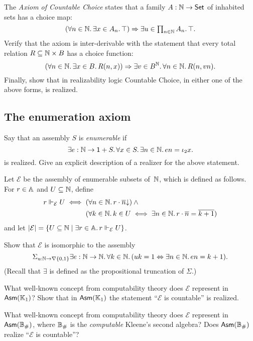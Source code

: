 \documentclass{article}
\begin{document}
The \emph{Axiom of Countable Choice} states that a family $A : \NN \to \Set$ of inhabited sets has a choice map:
%
\begin{equation*}
  \textstyle
  (\all{n \in \NN} \some{x \in A_n} \top) \lthen \some{u \in \prod_{n \in \NN} A_n} \top.
\end{equation*}
%
Verify that the axiom is inter-derivable with the statement that every total relation $R \subseteq \NN \times B$ has a choice function:
%
\begin{equation*}
  (\all{n \in \NN} \some{x \in B} R(n, x)) \lthen
  \some{v \in B^{\NN}} \all{n \in \NN} R(n, v n).
\end{equation*}
%
Finally, show that in realizability logic Countable Choice, in either one of the above forms, is realized.


\subsection{The enumeration axiom}
\label{sec:enumeration-axiom}

Say that an assembly $S$ is \emph{enumerable} if
%
\begin{equation*}
  \some{e : \NN \to \one + S}
  \all{x \in S}
  \some{n \in \NN}
  e n = \iota_2 x.
\end{equation*}
%
is realized. Give an explicit description of a realizer for the above statement.

Let $\mathcal{E}$ be the assembly of enumerable subsets of~$\NN$, which is defined as follows. For $r \in \AA$ and $U \subseteq \NN$, define
%
\begin{equation*}
  r \rz[\mathcal{E}] U
  \iff
  \begin{aligned}[t]
    & (\all{n \in \NN} \defined{r \cdot \numeral{n}}) \land {} \\
    & (\all{k \in \NN} k \in U \iff \some{n \in \NN} r \cdot \numeral{n} = \numeral{k + 1})
  \end{aligned}
\end{equation*}
%
and let $\S{\mathcal{E}} = \set{U \subseteq \NN \mid \some{r \in \AA} r \rz[\mathcal{E}] U}$.

Show that $\mathcal{E}$ is isomorphic to the assembly
%
\begin{equation*}
  \textstyle
  \Sigma_{u : \NN \to \nabla \set{0,1}}
  \some{e : \NN \to \NN}
  \all{k \in \NN}
  (u k = 1 \liff \some{n \in \NN} e n = k + 1).
\end{equation*}
%
(Recall that $\exists$ is defined as the propositional truncation of $\Sigma$.)

\medskip

What well-known concept from computability theory does $\mathcal{E}$ represent in $\Asm{\klone}$?
Show that in $\Asm{\klone}$ the statement ``$\mathcal{E}$ is countable'' is realized.

What well-known concept from computability theory does $\mathcal{E}$ represent in $\Asm{\comp{\Baire}}$, where $\comp{\Baire}$ is the \emph{computable} Kleene's second algebra? Does $\Asm{\comp{\Baire}}$ realize ``$\mathcal{E}$ is countable''?
\end{document}
